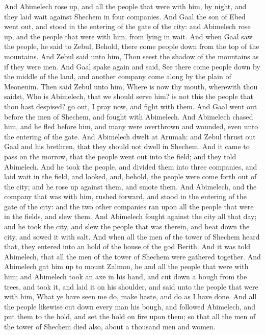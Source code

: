\begin{biblechapter}
\verse And Abimelech rose up, and all the people that were with him, by night, and they laid wait against Shechem in four companies.
\verse And Gaal the son of Ebed went out, and stood in the entering of the gate of the city: and Abimelech rose up, and the people that were with him, from lying in wait.
\verse And when Gaal saw the people, he said to Zebul, Behold, there come people down from the top of the mountains. And Zebul said unto him, Thou seest the shadow of the mountains as if they were men.
\verse And Gaal spake again and said, See there come people down by the middle of the land, and another company come along by the plain of Meonenim.
\verse Then said Zebul unto him, Where is now thy mouth, wherewith thou saidst, Who is Abimelech, that we should serve him? is not this the people that thou hast despised? go out, I pray now, and fight with them.
\verse And Gaal went out before the men of Shechem, and fought with Abimelech.
\verse And Abimelech chased him, and he fled before him, and many were overthrown and wounded, even unto the entering of the gate.
\verse And Abimelech dwelt at Arumah: and Zebul thrust out Gaal and his brethren, that they should not dwell in Shechem.
\verse And it came to pass on the morrow, that the people went out into the field; and they told Abimelech.
\verse And he took the people, and divided them into three companies, and laid wait in the field, and looked, and, behold, the people were come forth out of the city; and he rose up against them, and smote them.
\verse And Abimelech, and the company that was with him, rushed forward, and stood in the entering of the gate of the city: and the two other companies ran upon all the people that were in the fields, and slew them.
\verse And Abimelech fought against the city all that day; and he took the city, and slew the people that was therein, and beat down the city, and sowed it with salt.
\verse And when all the men of the tower of Shechem heard that, they entered into an hold of the house of the god Berith.
\verse And it was told Abimelech, that all the men of the tower of Shechem were gathered together.
\verse And Abimelech gat him up to mount Zalmon, he and all the people that were with him; and Abimelech took an axe in his hand, and cut down a bough from the trees, and took it, and laid it on his shoulder, and said unto the people that were with him, What ye have seen me do, make haste, and do as I have done.
\verse And all the people likewise cut down every man his bough, and followed Abimelech, and put them to the hold, and set the hold on fire upon them; so that all the men of the tower of Shechem died also, about a thousand men and women.

\end{biblechapter}
